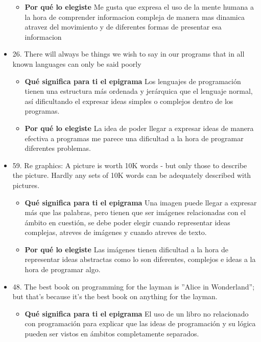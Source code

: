 \documentclass{article}
\begin{document}
\begin{itemize}
\begin{itemize}
                
            \item \textbf{ Por qué lo elegiste}
            \newline Me gusta que expresa el uso de la mente humana a la hora de comprender informacion compleja de manera mas dinamica atravez del movimiento y de diferentes formas de presentar esa informacion
            
        \end{itemize}
    \item 26. There will always be things we wish to say in our programs that in all known languages can only be said poorly
            \begin{itemize}
            \item \textbf{ Qué significa para ti el epigrama} 
                \newline Los lenguajes de programación tienen una estructura más ordenada y jerárquica que el lenguaje normal, así dificultando el expresar ideas simples o complejos dentro de los programas. 
            
                
            \item \textbf{ Por qué lo elegiste}
            \newline La idea de poder llegar a expresar ideas de manera efectiva a programas me parece una dificultad a la hora de programar diferentes problemas. 
        \end{itemize}
    \item 59. Re graphics: A picture is worth 10K words - but only those to describe the picture. Hardly any sets of 10K words can be adequately described with pictures.
            \begin{itemize}
            \item \textbf{ Qué significa para ti el epigrama} 
            \newline Una imagen puede llegar a expresar más que las palabras, pero tienen que ser imágenes relacionadas con el ámbito en cuestión, se debe poder elegir cuando representar ideas complejas, atreves de imágenes y cuando atreves de texto.
                
            
                
            \item \textbf{ Por qué lo elegiste}
            \newline Las imágenes tienen dificultad a la hora de representar ideas abstractas como lo son diferentes, complejos e ideas a la hora de programar algo.
        \end{itemize}
    \item 48. The best book on programming for the layman is ”Alice in Wonderland”; but that’s because it’s the best book on anything for the layman.
            \begin{itemize}
            \item \textbf{ Qué significa para ti el epigrama} 
                \newline El uso de un libro no relacionado con programación para explicar que las ideas de programación y su lógica pueden ser vistos en ámbitos completamente separados. 
            

\end{itemize}
\end{itemize}
\end{document}
